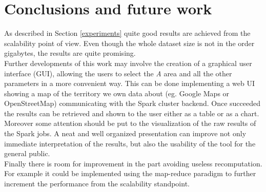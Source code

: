 \documentclass{sig-alternate-05-2015}
\begin{document}
\section{Conclusions and future work}
As described in Section \ref{experiments} quite good results are achieved from the scalability point of view. Even though the whole dataset size is not in the order gigabytes, the results are quite promising.\\
Further developments of this work may involve the creation of a graphical user interface (GUI), allowing the users to select the \emph{A} area and all the other parameters in a more convenient way. This can be done implementing a web UI showing a map of the territory we own data about (eg. Google Maps or OpenStreetMap) communicating with the Spark cluster backend. Once succeeded the results can be retrieved and shown to the user either as a table or as a chart.\\
Moreover some attention should be put to the visualization of the raw results of the Spark jobs. A neat and well organized presentation can improve not only immediate interpretation of the results, but also the usability of the tool for the general public.\\
Finally there is room for improvement in the part avoiding useless recomputation. For example it could be implemented using the map-reduce paradigm to further increment the performance from the scalability standpoint. 


%



%
%
\end{document}
